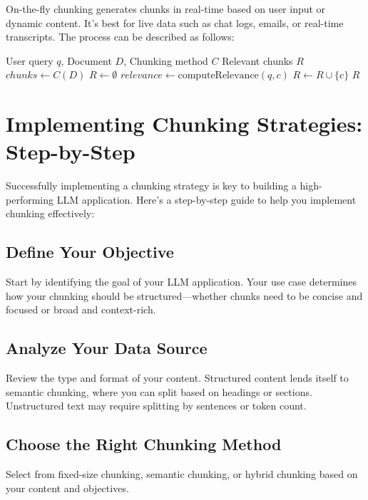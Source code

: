 \documentclass{article}
\begin{document}
On-the-fly chunking generates chunks in real-time based on user input or dynamic content. It's best for live data such as chat logs, emails, or real-time transcripts. The process can be described as follows:

\begin{algorithm}
\begin{algorithmic}[1]
\REQUIRE User query $q$, Document $D$, Chunking method $C$
\ENSURE Relevant chunks $R$
\STATE $chunks \gets C(D)$
\STATE $R \gets \emptyset$
    \STATE $relevance \gets \textrm{computeRelevance}(q, c)$
        \STATE $R \gets R \cup \{c\}$
    \ENDIF
\ENDFOR
\RETURN $R$
\end{algorithmic}
\end{algorithm}

\section{Implementing Chunking Strategies: Step-by-Step}

Successfully implementing a chunking strategy is key to building a high-performing LLM application. Here's a step-by-step guide to help you implement chunking effectively:

\subsection{Define Your Objective}

Start by identifying the goal of your LLM application. Your use case determines how your chunking should be structured—whether chunks need to be concise and focused or broad and context-rich.

\subsection{Analyze Your Data Source}

Review the type and format of your content. Structured content lends itself to semantic chunking, where you can split based on headings or sections. Unstructured text may require splitting by sentences or token count.

\subsection{Choose the Right Chunking Method}

Select from fixed-size chunking, semantic chunking, or hybrid chunking based on your content and objectives.
\end{document}
